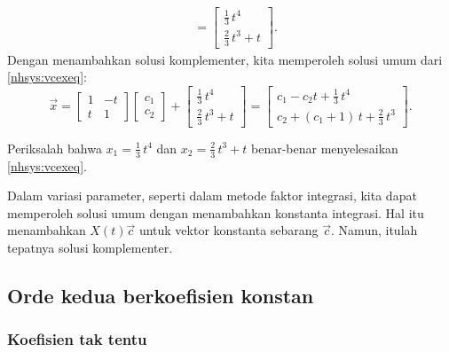 \begin{example}
\begin{equation*}
\begin{split}
& =
\begin{bmatrix}
\frac{1}{3}\,t^4 \\
\frac{2}{3}\,t^3 + t
\end{bmatrix}  .
\end{split}
\end{equation*}
Dengan menambahkan solusi komplementer, kita memperoleh solusi umum
dari \eqref{nhsys:vcexeq}:
\begin{equation*}
\vec{x} =
\begin{bmatrix}
1 & -t \\
t & 1
\end{bmatrix}
\begin{bmatrix}
c_1 \\ c_2
\end{bmatrix}
+
\begin{bmatrix}
\frac{1}{3}\,t^4 \\
\frac{2}{3}\,t^3 + t
\end{bmatrix}
=
\begin{bmatrix}
c_1 - c_2 t
+
\frac{1}{3}\,t^4 \\
c_2 + 
(c_1 + 1)\, t
+
\frac{2}{3}\,t^3
\end{bmatrix} .
\end{equation*}
\end{example}

\begin{exercise}
Periksalah bahwa $x_1 = 
\frac{1}{3}\,t^4$ dan $x_2 = 
\frac{2}{3}\,t^3 + t$ benar-benar menyelesaikan
\eqref{nhsys:vcexeq}.
\end{exercise}

Dalam variasi parameter, seperti dalam metode faktor integrasi,
kita dapat memperoleh solusi umum dengan menambahkan konstanta integrasi.
Hal itu menambahkan $X(t) \vec{c}$ untuk vektor konstanta sebarang $\vec{c}$.  Namun,
itulah tepatnya solusi komplementer.

\subsection{Orde kedua berkoefisien konstan}

\subsubsection{Koefisien tak tentu}

